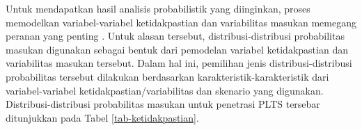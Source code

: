Untuk mendapatkan hasil analisis probabilistik yang diinginkan, proses memodelkan variabel-variabel ketidakpastian dan variabilitas masukan memegang peranan yang penting \cite{hasan_existing_2019}. Untuk alasan tersebut, distribusi-distribusi probabilitas masukan digunakan sebagai bentuk dari pemodelan variabel ketidakpastian dan variabilitas masukan tersebut. Dalam hal ini, pemilihan jenis distribusi-distribusi probabilitas tersebut dilakukan berdasarkan karakteristik-karakteristik dari variabel-variabel ketidakpastian/variabilitas dan skenario yang digunakan. Distribusi-distribusi probabilitas masukan untuk penetrasi PLTS tersebar ditunjukkan pada Tabel \ref{tab-ketidakpastian}.
